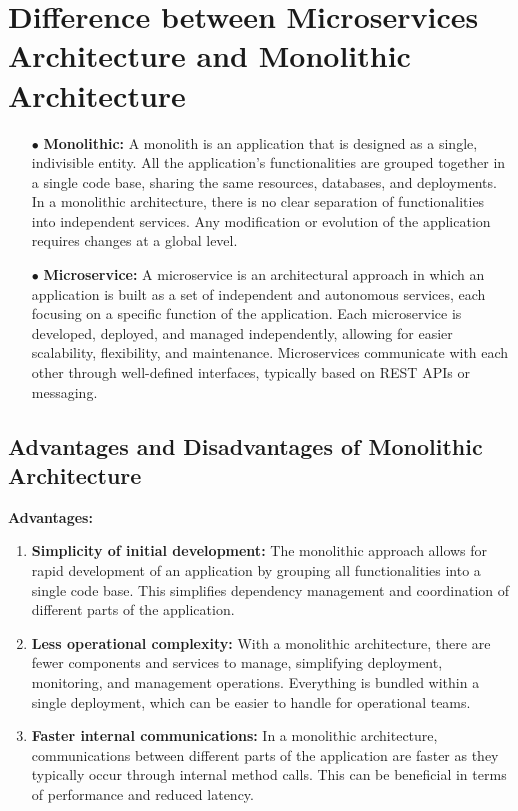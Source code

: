 \section{Difference between Microservices Architecture and Monolithic Architecture}
\begin{enumerate}
\item[$\bullet$] \textbf{Monolithic:} A monolith is an application that is designed as a single, indivisible entity. All the application's functionalities are grouped together in a single code base, sharing the same resources, databases, and deployments. In a monolithic architecture, there is no clear separation of functionalities into independent services. Any modification or evolution of the application requires changes at a global level.
\item[$\bullet$] \textbf{Microservice:} A microservice is an architectural approach in which an application is built as a set of independent and autonomous services, each focusing on a specific function of the application. Each microservice is developed, deployed, and managed independently, allowing for easier scalability, flexibility, and maintenance. Microservices communicate with each other through well-defined interfaces, typically based on REST APIs or messaging.
\end{enumerate}

\subsection{Advantages and Disadvantages of Monolithic Architecture}
\textbf{Advantages:}
\begin{enumerate}
\item \textbf{Simplicity of initial development:} The monolithic approach allows for rapid development of an application by grouping all functionalities into a single code base. This simplifies dependency management and coordination of different parts of the application.
\item \textbf{Less operational complexity:} With a monolithic architecture, there are fewer components and services to manage, simplifying deployment, monitoring, and management operations. Everything is bundled within a single deployment, which can be easier to handle for operational teams.
\item \textbf{Faster internal communications:} In a monolithic architecture, communications between different parts of the application are faster as they typically occur through internal method calls. This can be beneficial in terms of performance and reduced latency.
\end{enumerate}

